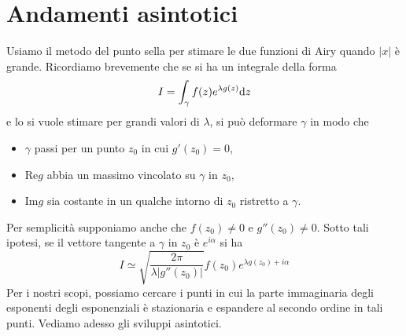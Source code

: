 \documentclass[11 pt]{article}
\renewcommand{\Re}{\mathrm{Re}}
\renewcommand{\Im}{\mathrm{Im}}
\begin{document}
	\section{Andamenti asintotici}
	Usiamo il metodo del punto sella per stimare le due funzioni di Airy quando $|x|$ è grande. Ricordiamo brevemente che se si ha un integrale della forma
	\[I=\int_{\gamma}f(z)e^{\lambda g(z)}\mathrm{d} z\]
	e lo si vuole stimare per grandi valori di $\lambda$, si può deformare $\gamma$ in modo che 
	\begin{itemize}
		\item $\gamma$ passi per un punto $z_0$ in cui $g'(z_0)=0$,
		\item $\Re g$ abbia un massimo vincolato su $\gamma$ in $z_0$,
		\item $\Im g$ sia costante in un qualche intorno di $z_0$ ristretto a $\gamma$.
	\end{itemize}
	Per semplicità supponiamo anche che $f(z_0)\neq0$ e $g''(z_0)\neq0$. Sotto tali ipotesi, se il vettore tangente a $\gamma$ in $z_0$ è $e^{i\alpha}$ si ha
	\[I\simeq\sqrt{\frac{2\pi}{\lambda|g''(z_0)|}}f(z_0)e^{\lambda g(z_0)+i\alpha}\]
	Per i nostri scopi, possiamo cercare i punti in cui la parte immaginaria degli esponenti degli esponenziali è stazionaria e espandere al secondo ordine in tali punti.
	Vediamo adesso gli sviluppi asintotici.
	
\end{document}
